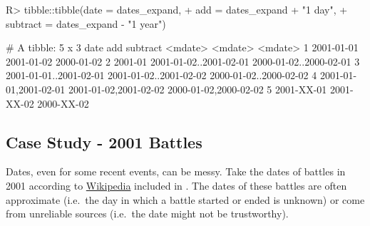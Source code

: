 \documentclass[
]{jss}
\begin{document}
\begin{CodeChunk}
\begin{CodeInput}
R> tibble::tibble(date = dates_expand,
+                add = dates_expand + "1 day",
+                subtract = dates_expand - "1 year")
\end{CodeInput}
\begin{CodeOutput}
# A tibble: 5 x 3
  date                    add                     subtract               
  <mdate>                 <mdate>                 <mdate>                
1 2001-01-01              2001-01-02              2000-01-02             
2 2001-01                 2001-01-02..2001-02-01  2000-01-02..2000-02-01 
3 2001-01-01..2001-02-01  2001-01-02..2001-02-02  2000-01-02..2000-02-02 
4 {2001-01-01,2001-02-01} {2001-01-02,2001-02-02} {2000-01-02,2000-02-02}
5 2001-XX-01              2001-XX-02              2000-XX-02             
\end{CodeOutput}
\end{CodeChunk}

\hypertarget{case-study---2001-battles}{%
\subsection{Case Study - 2001 Battles}\label{case-study---2001-battles}}

Dates, even for some recent events, can be messy. Take the dates of
battles in 2001 according to
\href{https://en.wikipedia.org/wiki/List_of_battles_in_the_21st_century}{Wikipedia}
included in . The dates of these battles are often
approximate (i.e.~the day in which a battle started or ended is unknown)
or come from unreliable sources (i.e.~the date might not be
trustworthy).
\end{document}
